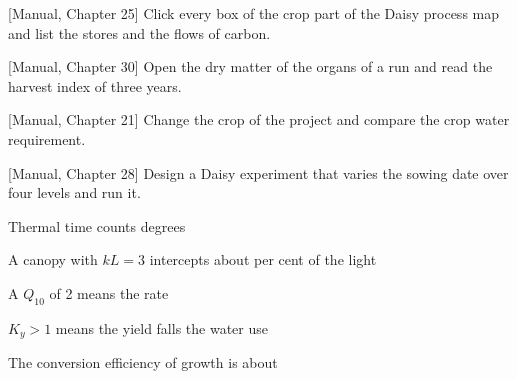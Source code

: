 \begin{exlist}
\item {\color{khblue}[Manual, Chapter 25]} Click every box of the crop part of the Daisy process map and list the stores and the flows of carbon.\par{}
\item {\color{khblue}[Manual, Chapter 30]} Open the dry matter of the organs of a run and read the harvest index of three years.\par{}
\item {\color{khblue}[Manual, Chapter 21]} Change the crop of the project and compare the crop water requirement.\par{}
\item {\color{khblue}[Manual, Chapter 28]} Design a Daisy experiment that varies the sowing date over four levels and run it.\par{}
\end{exlist}
\begin{exlist}
\item Thermal time counts degrees
\item A canopy with $kL=3$ intercepts about per cent of the light
\item A $Q_{10}$ of 2 means the rate
\item $K_y>1$ means the yield falls the water use
\item The conversion efficiency of growth is about
\end{exlist}

